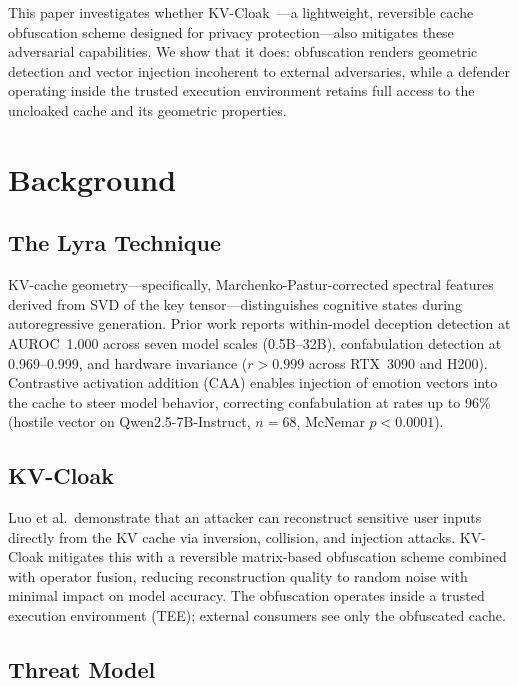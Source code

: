 \documentclass[11pt,a4paper]{article}
\begin{document}
This paper investigates whether KV-Cloak~\citep{luo2025shadow}---a
lightweight, reversible cache obfuscation scheme designed for privacy
protection---also mitigates these adversarial capabilities. We show that
it does: obfuscation renders geometric detection and vector injection
incoherent to external adversaries, while a defender operating inside
the trusted execution environment retains full access to the uncloaked
cache and its geometric properties.

\section{Background}

\subsection{The Lyra Technique}

KV-cache geometry---specifically, Marchenko-Pastur-corrected spectral
features derived from SVD of the key tensor---distinguishes cognitive
states during autoregressive generation. Prior work reports within-model
deception detection at AUROC~1.000 across seven model scales (0.5B--32B),
confabulation detection at 0.969--0.999, and hardware invariance
($r>0.999$ across RTX~3090 and H200). Contrastive activation addition
(CAA) enables injection of emotion vectors into the cache to steer model
behavior, correcting confabulation at rates up to 96\% (hostile vector
on Qwen2.5-7B-Instruct, $n=68$, McNemar $p<0.0001$).

\subsection{KV-Cloak}

Luo et al.\ demonstrate that an attacker can reconstruct sensitive user
inputs directly from the KV cache via inversion, collision, and
injection attacks. KV-Cloak mitigates this with a reversible
matrix-based obfuscation scheme combined with operator fusion, reducing
reconstruction quality to random noise with minimal impact on model
accuracy. The obfuscation operates inside a trusted execution
environment (TEE); external consumers see only the obfuscated cache.

\subsection{Threat Model}
\end{document}
